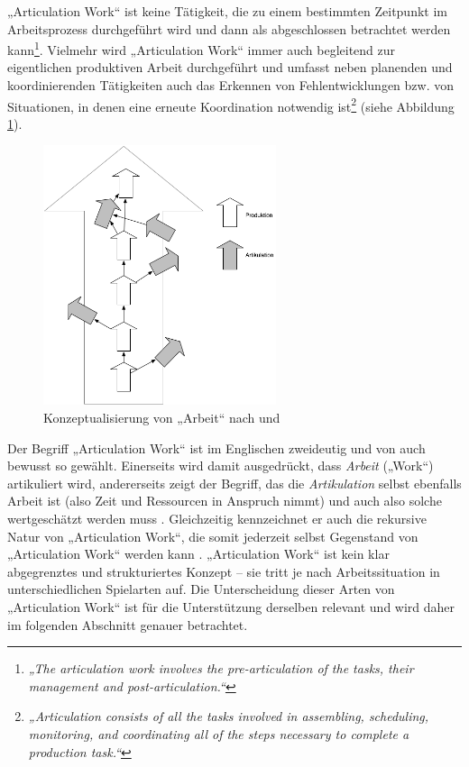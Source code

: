 „Articulation Work“ ist keine Tätigkeit, die zu einem bestimmten Zeitpunkt im Arbeitsprozess durchgeführt wird und dann als abgeschlossen betrachtet werden kann\footnote{\emph{„The articulation work involves the pre-articulation of the tasks, their management and post-articulation.“}\citep[][S. 121]{Raposo04}}. Vielmehr wird „Articulation Work“ immer auch begleitend zur eigentlichen produktiven Arbeit durchgeführt und umfasst neben planenden und koordinierenden Tätigkeiten auch das Erkennen von Fehlentwicklungen bzw. von Situationen, in denen eine erneute Koordination notwendig ist\footnote{\emph{„Articulation consists of all the tasks involved in assembling, scheduling, monitoring, and coordinating all of the steps necessary to complete a production task.“}\citep[][S. 266]{Gerson86}} (siehe Abbildung \ref{fig:img_ArticulationWork_ArtikulationProduktion}). 

\begin{figure}[htbp]
	\centering
		\includegraphics[height=3in]{img/ArticulationWork/ArtikulationProduktion.png}
	\caption{Konzeptualisierung von „Arbeit“ nach \citep{Strauss85} und \citep{Fujimura87}}
	\label{fig:img_ArticulationWork_ArtikulationProduktion}
\end{figure}

Der Begriff „Articulation Work“ ist im Englischen zweideutig und von \citeauthor{Strauss85} auch bewusst so gewählt. Einerseits wird damit ausgedrückt, dass \emph{Arbeit} („Work“) artikuliert wird, andererseits zeigt der Begriff, das die \emph{Artikulation} selbst ebenfalls Arbeit ist (also Zeit und Ressourcen in Anspruch nimmt) und auch also solche wertgeschätzt werden muss \citep{Fujimura87}. Gleichzeitig kennzeichnet er auch die rekursive Natur von „Articulation Work“, die somit jederzeit selbst Gegenstand von „Articulation Work“ werden kann \citep{Star99}. „Articulation Work“ ist kein klar abgegrenztes und strukturiertes Konzept -- sie tritt je nach Arbeitssituation in unterschiedlichen Spielarten auf. Die Unterscheidung dieser Arten von „Articulation Work“ ist für die Unterstützung derselben relevant und wird daher im folgenden Abschnitt genauer betrachtet.

